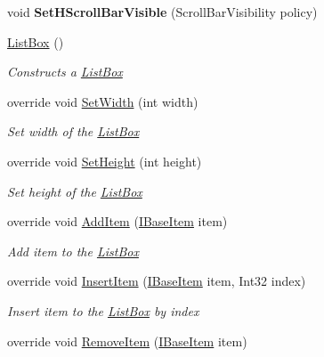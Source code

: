 \begin{DoxyCompactItemize}
\mbox{\label{class_space_v_i_l_1_1_list_box_a31359bba1e5cee94292f2f30a700f599}} 
void {\bfseries Set\+H\+Scroll\+Bar\+Visible} (Scroll\+Bar\+Visibility policy)
\item 
\mbox{\hyperlink{class_space_v_i_l_1_1_list_box_a8978541c968c377b489f94685336a2da}{List\+Box}} ()
\begin{DoxyCompactList}\small\item\em Constructs a \mbox{\hyperlink{class_space_v_i_l_1_1_list_box}{List\+Box}} \end{DoxyCompactList}\item 
override void \mbox{\hyperlink{class_space_v_i_l_1_1_list_box_a6e41c4678cdfd8b1a68ed0280b50cfff}{Set\+Width}} (int width)
\begin{DoxyCompactList}\small\item\em Set width of the \mbox{\hyperlink{class_space_v_i_l_1_1_list_box}{List\+Box}} \end{DoxyCompactList}\item 
override void \mbox{\hyperlink{class_space_v_i_l_1_1_list_box_a5b44bd011e83b56053b529cf55253296}{Set\+Height}} (int height)
\begin{DoxyCompactList}\small\item\em Set height of the \mbox{\hyperlink{class_space_v_i_l_1_1_list_box}{List\+Box}} \end{DoxyCompactList}\item 
override void \mbox{\hyperlink{class_space_v_i_l_1_1_list_box_a3650d9e40035bd0d22c30b475a0a90f0}{Add\+Item}} (\mbox{\hyperlink{interface_space_v_i_l_1_1_core_1_1_i_base_item}{I\+Base\+Item}} item)
\begin{DoxyCompactList}\small\item\em Add item to the \mbox{\hyperlink{class_space_v_i_l_1_1_list_box}{List\+Box}} \end{DoxyCompactList}\item 
override void \mbox{\hyperlink{class_space_v_i_l_1_1_list_box_a3d5da8acbfd4f0bb11594b5f4b9001c0}{Insert\+Item}} (\mbox{\hyperlink{interface_space_v_i_l_1_1_core_1_1_i_base_item}{I\+Base\+Item}} item, Int32 index)
\begin{DoxyCompactList}\small\item\em Insert item to the \mbox{\hyperlink{class_space_v_i_l_1_1_list_box}{List\+Box}} by index \end{DoxyCompactList}\item 
override void \mbox{\hyperlink{class_space_v_i_l_1_1_list_box_a3fac47d275899619c3f705c24816ff87}{Remove\+Item}} (\mbox{\hyperlink{interface_space_v_i_l_1_1_core_1_1_i_base_item}{I\+Base\+Item}} item)

\end{DoxyCompactItemize}
